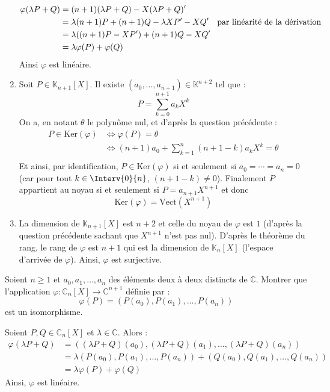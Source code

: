 \documentclass[a4paper,10pt]{report}
\begin{document}
\begin{enumerate}
\begin{align*}
\varphi(\lambda P + Q) & = (n+1)(\lambda P+Q)-X(\lambda P + Q)' \\
& = \lambda (n+1)P + (n+1)Q - \lambda X P' - XQ' \quad \hbox{par linéarité de la dérivation} \\
& = \lambda ((n+1)P-XP') + (n+1)Q-XQ' \\
& = \lambda \varphi(P) + \varphi(Q) 
\end{align*}
Ainsi $\varphi$ est linéaire.
\item Soit $P \in \mathbb{K}_{n+1}[X]$. Il existe $(a_0, \ldots, a_{n+1}) \in \mathbb{K}^{n+2}$ tel que :
$$ P = \sum_{k=0}^{n+1} a_k X^k $$
On a, en notant $\theta$ le polynôme nul, et d'après la question précédente : 
\begin{align*}
P \in \textrm{Ker}(\varphi) & \Longleftrightarrow  \varphi(P) = \theta \\
& \Longleftrightarrow (n+1) a_0 + \sum_{k=1}^n (n+1-k) a_k X^k =\theta  \\
\end{align*}
Et ainsi, par identification, $P \in \textrm{Ker}(\varphi)$ si et seulement si $a_0 = \cdots = a_n = 0$ (car pour tout $k \in \Interv{0}{n}$, $(n+1-k) \neq 0$). Finalement $P$ appartient au noyau si et seulement si $P = a_{n+1} X^{n+1}$ et donc 
$$\textrm{Ker}(\varphi)= \textrm{Vect}(X^{n+1})$$
\item La dimension de $\mathbb{K}_{n+1}[X]$ est $n+2$ et celle du noyau de $\varphi$ est $1$ (d'après la question précédente sachant que $X^{n+1}$ n'est pas nul). D'après le théorème du rang, le rang de $\varphi$ est $n+1$ qui est la dimension de $\mathbb{K}_n[X]$ (l'espace d'arrivée de $\varphi$). Ainsi, $\varphi$ est surjective.
\end{enumerate}

\medskip


\begin{Exa} Soient $n \geq 1$ et $a_{0} ,a_{1} , \ldots ,a_{n}$ des éléments deux à deux distincts de $\mathbb{C}$. Montrer que l'application $\varphi \colon \mathbb{C}_n[X] \rightarrow \mathbb{C}^{n+1}$ définie par :
  \[
  \varphi(P) = (P(a_{0}),P(a_{1}), \ldots ,P(a_{n}))
  \]
  est un isomorphisme.
\end{Exa}

\corr Soient $P,Q \in \mathbb{C}_n[X]$ et $\lambda \in \mathbb{C}$. Alors :
\begin{align*}
\varphi(\lambda P + Q ) & = ((\lambda P+Q)(a_{0}),(\lambda P+Q)(a_{1}), \ldots , (\lambda P+Q)(a_{n})) \\
& = \lambda (P(a_{0}),P(a_{1}), \ldots ,P(a_{n})) + (Q(a_{0}),Q(a_{1}), \ldots ,Q(a_{n})) \\
& = \lambda \varphi(P) + \varphi(Q)
\end{align*}
Ainsi, $\varphi$ est linéaire.
\end{document}

